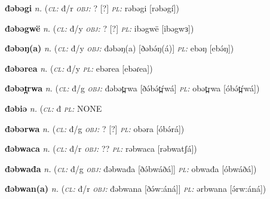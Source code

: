 \newentry
\headword\textbf{đəbəgi}  
\ipa{[ðəbəgí]}
\synpos\textit{n.} 
\class(\textit{\textsc{cl:}} {đ/r}
\object\textit{\textsc{obj:}} ? [?]
\plural\textit{\textsc{pl:}} rəbəgi [rəbəgí])

\newentry
\headword\textbf{đəbəgwë}  
\ipa{[ðəbəgwɜ]}
\synpos\textit{n.} 
\class(\textit{\textsc{cl:}} {đ/y}
\object\textit{\textsc{obj:}} ? [?]
\plural\textit{\textsc{pl:}} ibəgwë [ibəgwɜ])

\newentry
\headword\textbf{đəbəŋ(a)}  
\ipa{[ðəbə́ŋ(á)]}
\synpos\textit{n.} 
\class(\textit{\textsc{cl:}} {đ/y}
\object\textit{\textsc{obj:}} đəbəŋ(a) [ðəbə́ŋ(á)]
\plural\textit{\textsc{pl:}} ebəŋ [ebə́ŋ])

\newentry
\headword\textbf{đəbərea}  
\ipa{[ðəbəɾea]}
\synpos\textit{n.} 
\class(\textit{\textsc{cl:}} {đ/y}
\plural\textit{\textsc{pl:}} ebərea [ebəɾea])

\newentry
\headword\textbf{đəbət̪rwa}  
\ipa{[ðə́bə́t̪ŕwá]}
\synpos\textit{n.} 
\class(\textit{\textsc{cl:}} {đ/g}
\object\textit{\textsc{obj:}} đəbət̪rwa [ðə́bə́t̪ŕwá]
\plural\textit{\textsc{pl:}} obət̪rwa [óbə́t̪ŕwá])

\newentry
\headword\textbf{đəbiə}  
\ipa{[ðəbiə]}
\synpos\textit{n.} 
\class(\textit{\textsc{cl:}} {đ}
\plural\textit{\textsc{pl:}} NONE  

\newentry
\headword\textbf{đəbərwa}  
\ipa{[ðə́bə́rwá]}
\synpos\textit{n.} 
\class(\textit{\textsc{cl:}} {đ/g}
\object\textit{\textsc{obj:}} ? [?]
\plural\textit{\textsc{pl:}} obəra [óbə́rá])

\newentry
\headword\textbf{đəbwaca}  
\ipa{[ðəbwatʃá]}
\synpos\textit{n.} 
\class(\textit{\textsc{cl:}} {đ/r}
\object\textit{\textsc{obj:}} ??
\plural\textit{\textsc{pl:}} rəbwaca [rəbwatʃá])

\newentry
\headword\textbf{đəbwađa}  
\ipa{[ðə́bwáðá]}
\synpos\textit{n.} 
\class(\textit{\textsc{cl:}} {đ/g}
\object\textit{\textsc{obj:}} đəbwađa [ðə́bwáðá]]
\plural\textit{\textsc{pl:}} obwađa [óbwáðá])


\newentry
\headword\textbf{đəbwan(a)}  
\ipa{[ðə́w:án(á)]}
\synpos\textit{n.} 
\class(\textit{\textsc{cl:}} {đ/r}
\object\textit{\textsc{obj:}} đəbwana [ðə́w:áná]]
\plural\textit{\textsc{pl:}} ərbwana [ə́rw:áná])

